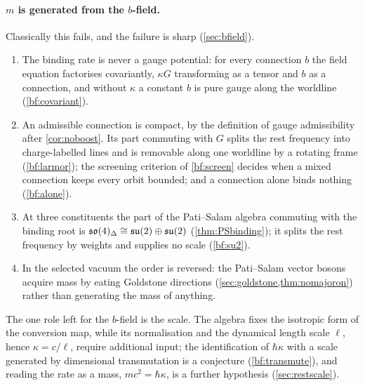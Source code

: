 \paragraph{$m$ is generated from the $b$-field.} Classically this fails, and the failure is sharp (\cref{sec:bfield}).
\begin{enumerate}[label=(\roman*),leftmargin=2.2em]
\item The binding rate is never a gauge potential: for every connection $b$ the field equation factorises covariantly, $\kappa G$ transforming as a
tensor and $b$ as a connection, and without $\kappa$ a constant $b$ is pure gauge along the worldline (\cref{bf:covariant}).
\item An admissible connection is compact, by the definition of gauge admissibility after \cref{cor:noboost}. Its part commuting with $G$ splits the rest
frequency into charge-labelled lines and is removable along one worldline by a rotating frame (\cref{bf:larmor}); the screening criterion of
\cref{bf:screen} decides when a mixed connection keeps every orbit bounded; and a connection alone binds nothing (\cref{bf:alone}).
\item At three constituents the part of the Pati--Salam algebra commuting with the binding root is $\mathfrak{so}(4)_\Delta\cong\mathfrak{su}(2)\oplus\mathfrak{su}(2)$
(\cref{thm:PSbinding}); it splits the rest frequency by weights and supplies no scale (\cref{bf:su2}).
\item In the selected vacuum the order is reversed: the Pati--Salam vector bosons acquire mass by eating Goldstone directions
(\cref{sec:goldstone,thm:nomajoron}) rather than generating the mass of anything.
\end{enumerate}
The one role left for the $b$-field is the scale. The algebra fixes the isotropic form of the conversion map, while its normalisation and the
dynamical length scale $\ell$, hence $\kappa=c/\ell$, require additional input; the identification of
$\hbar\kappa$ with a scale generated by dimensional transmutation is a conjecture (\cref{bf:transmute}), and reading the rate as a mass,
$mc^2=\hbar\kappa$, is a further hypothesis (\cref{sec:restscale}).

